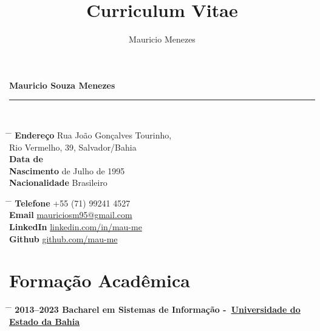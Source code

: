 \documentclass{article}
\title{Curriculum Vitae}
\author{Mauricio Menezes}
\begin{document}
{\huge{\color{slateblue}\textbf{Mauricio Souza Menezes}}}\\
\rule{\textwidth}{0.5mm}\\


\parbox{0.5\textwidth}{
	\begin{tabbing}
		\hspace{3cm} \= \hspace{4cm} \= \kill
		{\bf Endereço} \> Rua João Gonçalves Tourinho, \\
		\> Rio Vermelho, 39, Salvador/Bahia \\
		{\bf Data de } \\
		{\bf Nascimento}  de Julho de 1995 \\
		{\bf Nacionalidade} \> Brasileiro
	\end{tabbing}
}\hfil\parbox{0.5\textwidth}{
	\begin{tabbing}
		\hspace{3cm} \= \hspace{4cm} \= \kill
		{\bf Telefone} \> +55 (71) 99241 4527 \\
		{\bf Email} \> \href{mailto:mauriciosm95@gmail.com}{mauriciosm95@gmail.com} \\
		{\bf LinkedIn} \> \href{https://www.linkedin.com/in/mau-me/}{linkedin.com/in/mau-me} \\
		{\bf Github} \> \href{https://github.com/mau-me}{github.com/mau-me} \\
	\end{tabbing}
}





\section*{Formação Acadêmica}

\begin{tabbing}
	\hspace{2cm} \= \hspace{4cm} \= \kill
	\bf{2013--2023} \> Bacharel em Sistemas de Informação -~\href{https://portal.uneb.br/}{Universidade do Estado da Bahia} \\
\end{tabbing}
\end{document}
